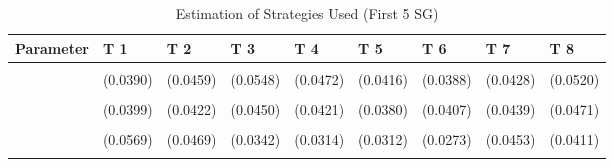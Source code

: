 \begin{table}[!h]
\centering
\caption{Estimation of Strategies Used (First 5 SG)}
\centering
\begin{tabular}[t]{lllllllll}
\toprule
Parameter & T 1 & T 2 & T 3 & T 4 & T 5 & T 6 & T 7 & T 8\\
\midrule
\cellcolor{gray!10}{gamma} & \cellcolor{gray!10}{0.6976***} & \cellcolor{gray!10}{0.6935***} & \cellcolor{gray!10}{0.8535***} & \cellcolor{gray!10}{0.8092***} & \cellcolor{gray!10}{0.7199***} & \cellcolor{gray!10}{0.7378***} & \cellcolor{gray!10}{0.6983***} & \cellcolor{gray!10}{0.7656***}\\
 & (0.0390) & (0.0459) & (0.0548) & (0.0472) & (0.0416) & (0.0388) & (0.0428) & (0.0520)\\
\cellcolor{gray!10}{AD} & \cellcolor{gray!10}{0.3933***} & \cellcolor{gray!10}{0.3645***} & \cellcolor{gray!10}{0.7130***} & \cellcolor{gray!10}{0.6854***} & \cellcolor{gray!10}{0.6786***} & \cellcolor{gray!10}{0.7913***} & \cellcolor{gray!10}{0.3525***} & \cellcolor{gray!10}{0.3643***}\\
 & (0.0399) & (0.0422) & (0.0450) & (0.0421) & (0.0380) & (0.0407) & (0.0439) & (0.0471)\\
\cellcolor{gray!10}{AC} & \cellcolor{gray!10}{0.2224***} & \cellcolor{gray!10}{0.2865***} & \cellcolor{gray!10}{0.1819***} & \cellcolor{gray!10}{0.1797***} & \cellcolor{gray!10}{0.1593***} & \cellcolor{gray!10}{0.1131***} & \cellcolor{gray!10}{0.2358***} & \cellcolor{gray!10}{0.2307***}\\
\addlinespace
 & (0.0569) & (0.0469) & (0.0342) & (0.0314) & (0.0312) & (0.0273) & (0.0453) & (0.0411)\\
\cellcolor{gray!10}{G} & \cellcolor{gray!10}{0.3842***} & \cellcolor{gray!10}{0.3491***} & \cellcolor{gray!10}{0.1051*} & \cellcolor{gray!10}{0.1349***} & \cellcolor{gray!10}{0.1621***} & \cellcolor{gray!10}{0.0957**} & \cellcolor{gray!10}{0.4117***} & \cellcolor{gray!10}{0.4050***}\\
\bottomrule
\end{tabular}
\end{table}